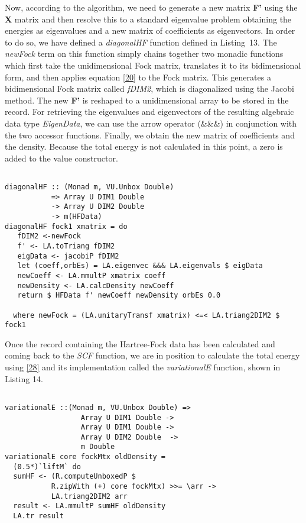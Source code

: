 \documentclass{tmr}
\begin{document}
Now, according to the algorithm, we need to generate a new matrix \textbf{F'} using
the \textbf{X} matrix and then resolve this to a standard eigenvalue problem obtaining
the energies as eigenvalues and a new matrix of coefficients as eigenvectors. In order to
do so, we have defined a \textit{diagonalHF} function defined in Listing~13. The \textit{newFock} 
term on this function simply chains together two monadic functions which first take 
the unidimensional Fock matrix, translates it to its bidimensional form, and then applies
equation \eqref{20} to the Fock matrix. This generates a bidimensional Fock matrix called \textit{fDIM2},
which is diagonalized using the Jacobi method. The new \textbf{F'} is reshaped to
a unidimensional array to be stored in the record. For retrieving the eigenvalues and eigenvectors of
the resulting algebraic data type \textit{EigenData}, we can use the arrow operator (\&\&\&)
 in conjunction with the two accessor functions. Finally, we obtain the new matrix of
coefficients and the density. Because the total energy is not calculated in this point,
a zero is added to the value constructor.

\begin{lstlisting}[float,captionpos=b,belowcaptionskip=4pt, caption= The DiagonalHF Function]   

diagonalHF :: (Monad m, VU.Unbox Double) 
           => Array U DIM1 Double
           -> Array U DIM2 Double 
           -> m(HFData)
diagonalHF fock1 xmatrix = do
   fDIM2 <-newFock
   f' <- LA.toTriang fDIM2
   eigData <- jacobiP fDIM2
   let (coeff,orbEs) = LA.eigenvec &&& LA.eigenvals $ eigData
   newCoeff <- LA.mmultP xmatrix coeff
   newDensity <- LA.calcDensity newCoeff
   return $ HFData f' newCoeff newDensity orbEs 0.0

  where newFock = (LA.unitaryTransf xmatrix) <=< LA.triang2DIM2 $ fock1

\end{lstlisting}

Once the record containing the Hartree-Fock data has been calculated and coming back
to the \textit{SCF} function, we are in position to calculate the total energy using
\eqref{28} and its implementation called the \textit{variationalE} function, shown in Listing 14.

\begin{lstlisting}[float,captionpos=b,belowcaptionskip=4pt, caption= The DiagonalHF Function]   

variationalE ::(Monad m, VU.Unbox Double) => 
                  Array U DIM1 Double -> 
                  Array U DIM1 Double -> 
                  Array U DIM2 Double  ->
                  m Double
variationalE core fockMtx oldDensity = 
  (0.5*)`liftM` do
  sumHF <- (R.computeUnboxedP $ 
           R.zipWith (+) core fockMtx) >>= \arr ->
           LA.triang2DIM2 arr
  result <- LA.mmultP sumHF oldDensity
  LA.tr result

\end{lstlisting}
\end{document}
